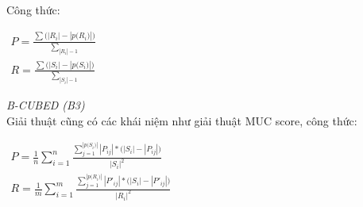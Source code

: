\documentclass[12pt]{extarticle}
\begin{document}
				\\Công thức:
					\begin{center}
						$\begin{aligned}
							P = \frac{\sum \big(|R_i| - |p \big(R_i)|)}{\sum_{|R_i| - 1}}
						\end{aligned}$
						\\
						$\begin{aligned}
							R = \frac{\sum \big(|S_i| - |p \big(S_i)|)}{\sum_{|S_i| - 1}}
						\end{aligned}$												
					\end{center}

					\textit{B-CUBED (B3)}
					\\Giải thuật cũng có các khái niệm như giải thuật MUC score, công thức:
					\begin{center}
						$\begin{aligned}
							P = \frac{1}{n} \sum_{i=1}^{n} \frac{\sum_{j=1}^{|p \big(S_i)|} |P_{ij}|*\big(|S_i| - |P_{ij}|)} {|S_{i}|^2}
						\end{aligned}$
						\\
						$\begin{aligned}
							R = \frac{1}{m} \sum_{i=1}^{m} \frac{\sum_{j=1}^{|p \big(R_i)|} |P'_{ij}|*\big(|S_i| - |P'_{ij}|)} {|R_{i}|^2}
						\end{aligned}$												
					\end{center}
\end{document}
